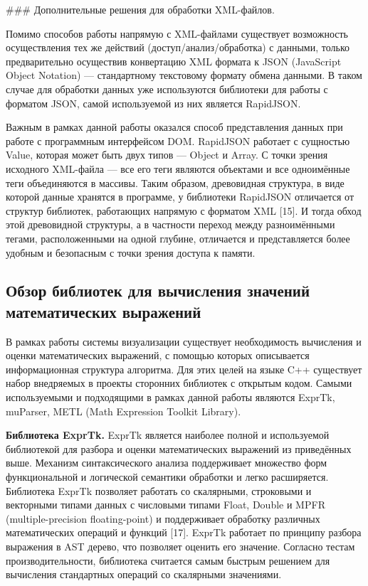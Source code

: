 ### Дополнительные решения для обработки XML-файлов.

Помимо способов работы напрямую с XML-файлами существует возможность осуществления тех же действий (доступ/анализ/обработка) с данными, только предварительно осуществив конвертацию XML формата к JSON (JavaScript Object Notation) — стандартному текстовому формату обмена данными. В таком случае для обработки данных уже используются библиотеки для работы с форматом JSON, самой используемой из них является RapidJSON.

Важным в рамках данной работы оказался способ представления данных при работе с программным интерфейсом DOM. RapidJSON работает с сущностью Value, которая может быть двух типов — Object и Array. С точки зрения исходного XML-файла — все его теги являются объектами и все одноимённые теги объединяются в массивы. Таким образом, древовидная структура, в виде которой данные хранятся в программе, у библиотеки RapidJSON отличается от структур библиотек, работающих напрямую с форматом XML [15]. И тогда обход этой древовидной структуры, а в частности переход между разноимёнными тегами, расположенными на одной глубине, отличается и представляется более удобным и безопасным с точки зрения доступа к памяти.

\subsection {Обзор библиотек для вычисления значений математических выражений}

В рамках работы системы визуализации существует необходимость вычисления и оценки математических выражений, с помощью которых описывается информационная структура алгоритма. Для этих целей на языке C++ существует набор внедряемых в проекты сторонних библиотек с открытым кодом. Самыми используемыми и подходящими в рамках данной работы являются ExprTk, muParser, METL (Math Expression Toolkit Library).

\textbf {Библиотека ExprTk.} ExprTk является наиболее полной и используемой библиотекой для разбора и оценки математических выражений из приведённых выше. Механизм синтаксического анализа поддерживает множество форм функциональной и логической семантики обработки и легко расширяется. Библиотека ExprTk позволяет работать со скалярными, строковыми и векторными типами  данных с числовыми типами Float, Double и MPFR (multiple-precision floating-point) и поддерживает обработку различных математических операций и функций [17]. ExprTk работает по принципу разбора выражения в AST дерево, что позволяет оценить его значение. Согласно тестам производительности, библиотека считается самым быстрым решением для вычисления стандартных операций со скалярными значениями.

